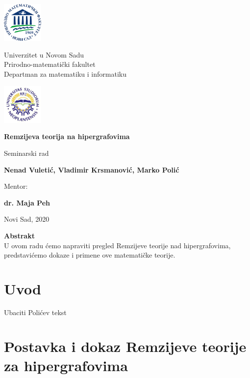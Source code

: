 \documentclass[a4paper]{article}
\newcommand{\autor}{ \centering Nenad Vuletić, Vladimir Krsmanović, Marko Polić}
\newcommand{\naslov}{Remzijeva teorija na hipergrafovima}
\newcommand{\datum}{Novi Sad, 2020}
\newcommand{\mentor}{dr. Maja Peh}
\begin{document}
	\begin{center}
		
		\includegraphics[width=2cm]{grbPMF}\hfill
		\parbox[b]{45ex}{\centering 
			Univerzitet u Novom Sadu\\
			Prirodno-matematički fakultet\\
			Departman za matematiku i informatiku}\hfill 
		\includegraphics[width=2cm]{grbUNS}
		
		\vspace{22ex}
				
		{\Huge {\bf \setlength{\baselineskip}{1.5\baselineskip}\naslov}}
		
		\vspace{4ex}
		Seminarski rad
		
		\vspace{12ex}
		\parbox[b]{\textwidth}{{\Large {\bf \hspace{1cm}\autor}}}
		\vspace{10ex}
		
		{\Large Mentor:}
		
		{\Large  \textbf{\mentor}}
		
		\vfill
		
		\datum
		
	\end{center}
	\thispagestyle{empty}
	\newpage	
	\vfill
	\begin{center}
		\textbf{Abstrakt}\\
		U ovom radu ćemo napraviti pregled Remzijeve teorije nad hipergrafovima, predstavićemo dokaze i primene ove matematičke teorije.
		\thispagestyle{empty}
	\end{center}
	\pagebreak
	\tableofcontents
	\newpage
	\section{Uvod}
	Ubaciti Polićev tekst
	\section{Postavka i dokaz Remzijeve teorije za hipergrafovima}
\end{document}
